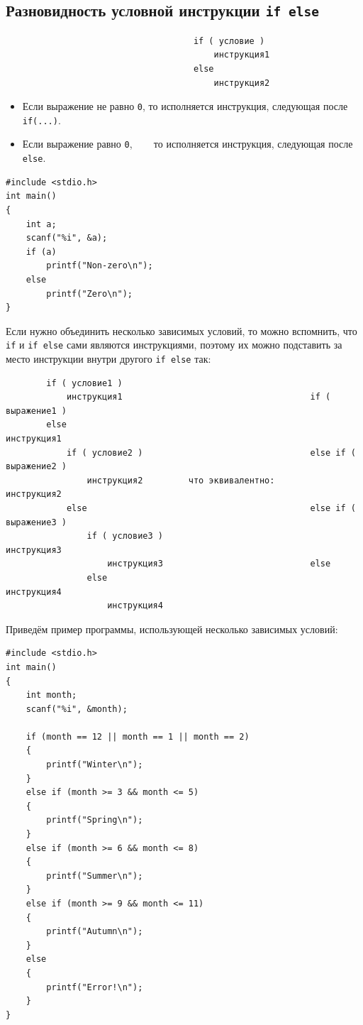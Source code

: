 \documentclass{article}
\begin{document}
\subsection*{Разновидность условной инструкции \texttt{if else}}
\begin{lstlisting}
                                     if ( условие )
                                         инструкция1
                                     else 
                                         инструкция2
\end{lstlisting}
\begin{itemize}
\item Если выражение не равно \texttt{0}, то исполняется инструкция, следующая после \texttt{if(...)}.
\item Если выражение равно \texttt{0}, ~~~ то исполняется инструкция, следующая после \texttt{else}.
\end{itemize}
\begin{lstlisting}
#include <stdio.h>
int main()
{
    int a;
    scanf("%i", &a);
    if (a)
        printf("Non-zero\n");
    else
        printf("Zero\n");
}
\end{lstlisting}
Если нужно объединить несколько зависимых условий, то можно вспомнить, что \texttt{if} и \texttt{if else} сами являются инструкциями, поэтому их можно подставить за место инструкции внутри другого \texttt{if else} так:
\begin{lstlisting}
        if ( условие1 )                                                                             
            инструкция1                                     if ( выражение1 )
        else                                                    инструкция1
            if ( условие2 )                                 else if ( выражение2 )
                инструкция2         что эквивалентно:           инструкция2
            else                                            else if ( выражение3 )            
                if ( условие3 )                                 инструкция3
                    инструкция3                             else
                else                                            инструкция4
                    инструкция4                                                                                                                        
\end{lstlisting}

Приведём пример программы, использующей несколько зависимых условий:
\begin{lstlisting}
#include <stdio.h>
int main() 
{
    int month;
    scanf("%i", &month);
    
    if (month == 12 || month == 1 || month == 2)
    {
        printf("Winter\n");
    }
    else if (month >= 3 && month <= 5) 
    {
        printf("Spring\n");
    }
    else if (month >= 6 && month <= 8) 
    {
        printf("Summer\n");
    }
    else if (month >= 9 && month <= 11) 
    {
        printf("Autumn\n");
    }
    else 
    {
        printf("Error!\n");
    }
}
\end{lstlisting}
\end{document}
